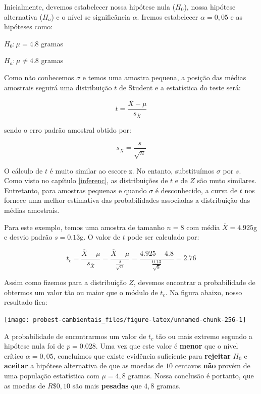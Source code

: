 \documentclass[
]{book}
\begin{document}
Inicialmente, devemos estabelecer nossa hipótese nula (\(H_0\)), nossa hipótese alternativa (\(H_a\)) e o nível se significância \(\alpha\). Iremos estabelecer \(\alpha = 0,05\) e as hipóteses como:

\(H_0: \mu = 4.8\) gramas

\(H_a: \mu \ne 4.8\) gramas

Como não conhecemos \(\sigma\) e temos uma amostra pequena, a posição das médias amostrais seguirá uma distribuição \(t\) de Student e a estatística do teste será:

\[t = \frac{\overline{X} - \mu}{s_{\overline{X}}}\]

sendo o erro padrão amostral obtido por:

\[s_{\overline{X}} = \frac{s}{\sqrt{n}}\]

O cálculo de \(t\) é muito similar ao escore z. No entanto, substituímos \(\sigma\) por \(s\). Como visto no capítulo \ref{inferenc}, as distribuições de \(t\) e de \(Z\) são muto similares. Entretanto, para amostras pequenas e quando \(\sigma\) é desconhecido, a curva de \(t\) nos fornece uma melhor estimativa das probabilidades associadas a distribuição das médias amostrais.

Para este exemplo, temos uma amostra de tamanho \(n = 8\) com média \(\overline{X} = 4.925\)g e desvio padrão \(s = 0.13\)g. O valor de \(t\) pode ser calculado por:

\[t_{c} = \frac{\overline{X} - \mu}{s_{\overline{X}}} = \frac{\overline{X} - \mu}{\frac{s}{\sqrt{n}}} = \frac{4.925  - 4.8}{\frac{0.13}{\sqrt{8}}} = 2.76\]

Assim como fizemos para a distribuição \(Z\), devemos encontrar a probabilidade de obtermos um valor tão ou maior que o módulo de \(t_c\). Na figura abaixo, nosso resultado fica:

\begin{center}\texttt{[image: probest-cambientais\_files/figure-latex/unnamed-chunk-256-1]} \end{center}

A probabilidade de encontrarmos um valor de \(t_c\) tão ou mais extremo segundo a hipótese nula foi de \(p = 0.028\). Uma vez que este valor é \textbf{menor} que o nível crítico \(\alpha = 0,05\), concluímos que existe evidência suficiente para \textbf{rejeitar} \(H_0\) e \textbf{aceitar} a hipótese alternativa de que as moedas de \(10\) centavos \textbf{não} provém de uma população estatística com \(\mu = 4,8\) gramas. Nossa conclusão é portanto, que as moedas de \(R\$ 0,10\) são mais \textbf{pesadas} que \(4,8\) gramas.
\end{document}
